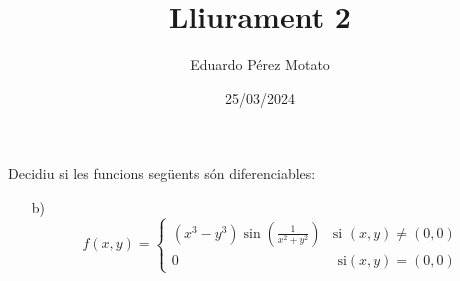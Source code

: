 \documentclass[a4paper, 12pt]{article}
\title{Lliurament 2}
\author{Eduardo Pérez Motato}
\date{25/03/2024}
\begin{document}
    \makeheader

    \setcounter{numex}{20}
    \begin{exercici}
        Decidiu si les funcions següents són diferenciables:
        \begin{itemize}
            \item[b)]
            \begin{displaymath}
                f(x,y) =
                \begin{cases}
                    \left(x^3-y^3\right)\sin{\left(\frac{1}{x^2+y^2}\right)} & \text{si } \left(x,y\right)  \neq \left(0,0\right)\\
                    0 & \text{ si} \left(x,y\right) = \left(0,0\right) 
                \end{cases}
            \end{displaymath}
        \end{itemize}
    \end{exercici}
\end{document}
